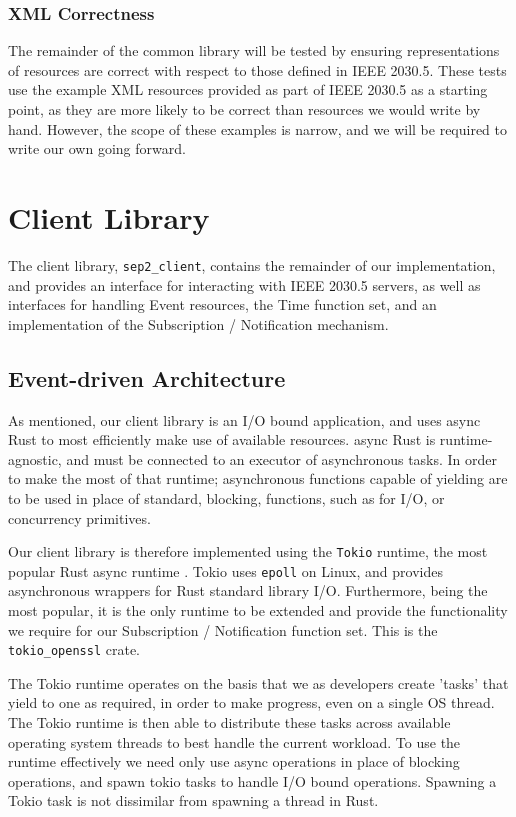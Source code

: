 \subsubsection{XML Correctness}
The remainder of the common library will be tested by ensuring representations of resources are correct with respect to those defined in IEEE 2030.5.
These tests use the example XML resources provided as part of IEEE 2030.5 as a starting point, as they are more likely to be correct than resources we would write by hand. However, the scope of these examples is narrow, and we will be required to write our own going forward.

\section{Client Library}
The client library, \texttt{sep2\_client}, contains the remainder of our implementation, and provides an interface for interacting with IEEE 2030.5 servers, as well as interfaces for handling Event resources, the Time function set, and an implementation of the Subscription / Notification mechanism. 

\subsection{Event-driven Architecture}
As mentioned, our client library is an I/O bound application, and uses async Rust to most efficiently make use of available resources. async Rust is runtime-agnostic, and must be connected to an executor of asynchronous tasks. In order to make the most of that runtime; asynchronous functions capable of yielding are to be used in place of standard, blocking, functions, such as for I/O, or concurrency primitives.

Our client library is therefore implemented using the \texttt{Tokio} runtime, the most popular Rust async runtime \cite{Tokio}. Tokio uses \texttt{epoll} on Linux, and provides asynchronous wrappers for Rust standard library I/O. Furthermore, being the most popular, it is the only runtime to be extended and provide the functionality we require for our Subscription / Notification function set. This is the \texttt{tokio\_openssl} crate.

The Tokio runtime operates on the basis that we as developers create 'tasks' that yield to one as required, in order to make progress, even on a single OS thread. The Tokio runtime is then able to distribute these tasks across available operating system threads to best handle the current workload. To use the runtime effectively we need only use async operations in place of blocking operations, and spawn tokio tasks to handle I/O bound operations.  Spawning a Tokio task is not dissimilar from spawning a thread in Rust.

